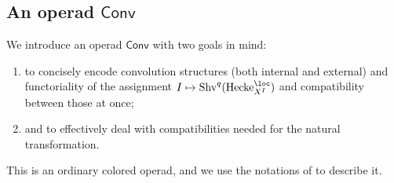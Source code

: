 \documentclass[10pt]{amsart}
\theoremstyle{remark}
\newcommand{\on}{\operatorname}
\newcommand{\Shv}{\on{Shv}}
\newcommand{\Hecke}{\on{Hecke}}
\newcommand{\Conv}{\mathsf{Conv}}
\begin{document}
\subsection{An operad $\Conv$}\label{ssec: an operad Conv}
We introduce an operad $\Conv$ with two goals in mind:
\begin{enumerate}
    \item to concisely encode convolution structures (both internal and external) and functoriality of the assignment $I\mapsto \Shv^q(\Hecke^{\loc}_{X^I})$ and compatibility between those at once;
    \item and to effectively deal with compatibilities needed for the natural transformation.
\end{enumerate}
This is an ordinary colored operad, and we use the notations of \cite[Definition 2.1.1.1]{HA} to describe it.
\end{document}
